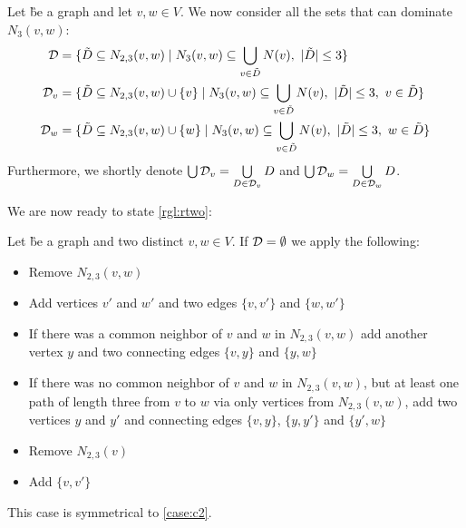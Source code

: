 \begin{definition}
Let \G be a graph and let $v,w \in V$. We now consider all the sets that can dominate $N_3(v,w)$:
\begin{align}
    \mathcal{D} & = \{ \tilde D \subseteq N_{2,3}(v,w)            \mid N_3(v,w) \subseteq \bigcup_{v \in \tilde D} N(v),\ |\tilde D| \leq 3                  \} \\
    \mathcal{D}_{v}  & = \{ \tilde D \subseteq N_{2,3}(v,w) \cup \{v\} \mid N_3(v,w) \subseteq \bigcup_{v \in \tilde D} N(v),\ |\tilde D| \leq 3,\ v \in \tilde D \} \\
    \mathcal{D}_{w}  & = \{ \tilde D \subseteq N_{2,3}(v,w) \cup \{w\} \mid N_3(v,w) \subseteq \bigcup_{v \in \tilde D} N(v),\ |\tilde D| \leq 3,\ w \in \tilde D \}
\end{align}
Furthermore, we shortly denote $\bigcup \mathcal{D}_{v} = \bigcup\limits_{D \in \mathcal{D}_{v}}D $ and $\bigcup \mathcal{D}_{w} = \bigcup\limits_{D \in \mathcal{D}_{w}}D$.
\end{definition}

\noindent We are now ready to state \cref{rgl:rtwo}:

\begin{rgl}\label{rgl:rtwo}
    Let \G be a graph and two distinct $v,w \in V$. If $\mathbf{\mathcal{D} = \emptyset}$ we apply the following:
    \begin{caseof}
        
        \vspace{-5mm}
        \begin{itemize}
            \item Remove $N_{2,3}(v,w)$
            \item Add vertices $v'$ and $w'$ and two edges $\{v, v'\}$ and $\{w, w'\}$
            \item If there was a common neighbor of $v$ and $w$ in $N_{2,3}(v,w)$ add another vertex $y$ and two connecting edges  $\{v, y\}$ and $\{y, w\}$
            \item If there was no common neighbor of $v$ and $w$ in $N_{2,3}(v,w)$, but at least one path of length three from $v$ to $w$ via only vertices from $N_{2,3}(v,w)$, add two vertices $y$ and $y'$ and connecting edges $\{v,y\}$, $\{y, y'\}$ and $\{y', w\}$
        \end{itemize}

        \vspace{-5mm}
        \begin{itemize}
            \item Remove $N_{2,3}(v)$ %
            \item Add $\{v, v'\}$
        \end{itemize}
        
         This case is symmetrical to \cref{case:c2}.
    \end{caseof}
\end{rgl}

